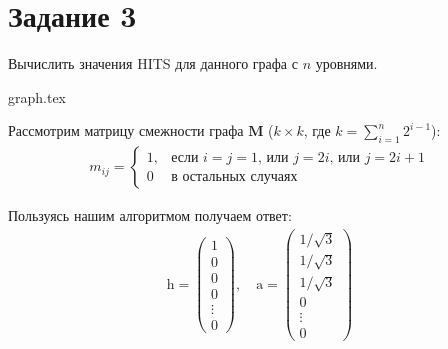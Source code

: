 \documentclass[class=article,crop=false]{standalone}
\begin{document}
    \section*{Задание 3}
    Вычислить значения HITS для данного графа с $n$ уровнями.

    \begin{figure*}[h]
        \centering
        {graph.tex}
    \end{figure*}

    \noindent Рассмотрим матрицу смежности графа $\mathbf{M}$ ($k\times k$, где $k=\sum\limits_{i=1}^n 2^{i-1}$):
    \begin{gather*}
        m_{ij}=
        \begin{cases}
            1,&\text{если $i=j=1$, или $j=2i$, или $j=2i+1$}\\
            0&\text{в остальных случаях}
        \end{cases}
    \end{gather*}

    \noindent Пользуясь нашим алгоритмом получаем ответ:
    \begin{gather*}
        \mathrm{h}=
        \begin{pmatrix}
            1      \\
            0      \\
            0      \\
            0      \\
            \vdots \\
            0
        \end{pmatrix},\quad
        \mathrm{a}=
        \begin{pmatrix}
            1/\sqrt{3} \\
            1/\sqrt{3} \\
            1/\sqrt{3} \\
            0          \\
            \vdots     \\
            0
        \end{pmatrix}
    \end{gather*}
\end{document}
